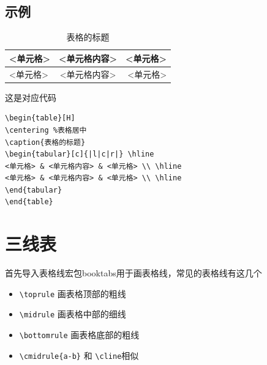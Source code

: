 \documentclass[cn,chinese,color=cyan]{elegantbook}
\begin{document}
\subsection{示例}
\begin{table}[H]
	\centering %
	\caption{表格的标题}
	\begin{tabular}[c]{|l|c|r|} \hline
		<单元格> & <单元格内容> & <单元格> \\ \hline
		<单元格> & <单元格内容> & <单元格> \\ \hline
	\end{tabular}
\end{table}
这是对应代码
\begin{lstlisting}[style=R]
\begin{table}[H]
\centering %表格居中
\caption{表格的标题}
\begin{tabular}[c]{|l|c|r|} \hline
<单元格> & <单元格内容> & <单元格> \\ \hline
<单元格> & <单元格内容> & <单元格> \\ \hline
\end{tabular}
\end{table}
\end{lstlisting}

\section{三线表}
首先导入表格线宏包booktabs用于画表格线，常见的表格线有这几个
\begin{itemize}
	\item \verb|\toprule| 画表格顶部的粗线
	\item \verb|\midrule| 画表格中部的细线
	\item \verb|\bottomrule| 画表格底部的粗线
	\item \verb|\cmidrule{a-b}| 和 \verb|\cline|相似
\end{itemize}
\end{document}
